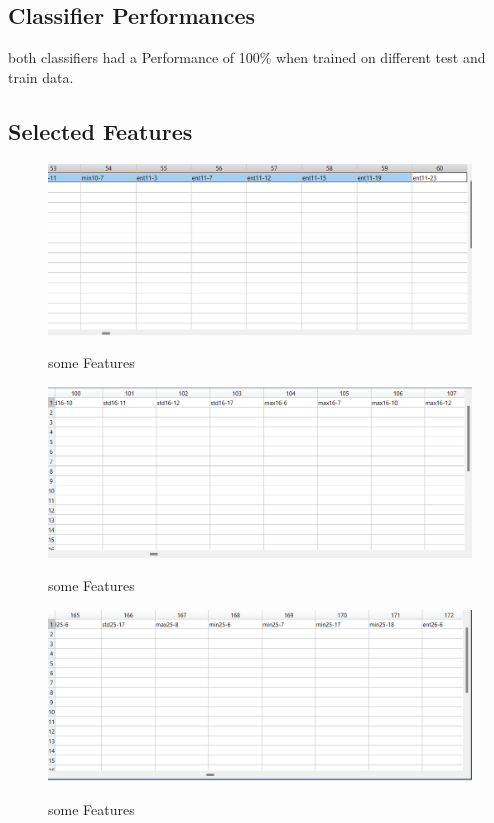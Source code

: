 \documentclass[11pt]{article}
\begin{document}
\subsection{Classifier Performances}
both classifiers had a Performance of 100\% when trained on different test and train data.


\subsection{Selected Features}
\begin{figure}[H]
    \begin{center}
        \includegraphics[scale=0.6]{Fig/Feat1.png}
        \label{fig:shannonEntropy}
        \caption{some Features}
    \end{center}
\end{figure}

\begin{figure}[H]
    \begin{center}
        \includegraphics[scale=0.6]{Fig/Feat2.png}
        \label{fig:shannonEntropy}
        \caption{some Features}
    \end{center}
\end{figure}

\begin{figure}[H]
    \begin{center}
        \includegraphics[scale=0.6]{Fig/Feat3.png}
        \label{fig:shannonEntropy}
        \caption{some Features}
    \end{center}
\end{figure}
\end{document}
